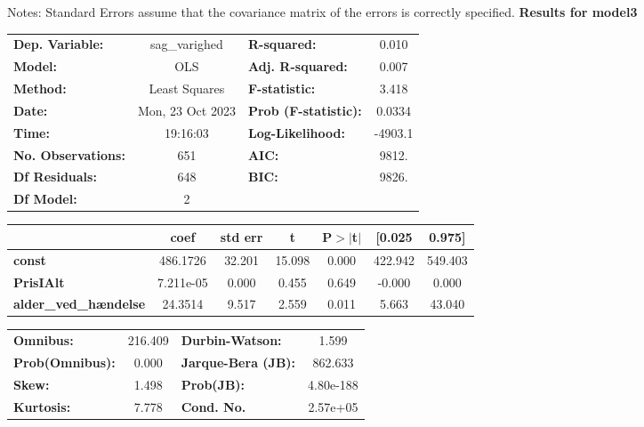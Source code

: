 Notes: \newline
 [1] Standard Errors assume that the covariance matrix of the errors is correctly specified.
\newpage 
\textbf{Results for model3} \\ 
\begin{center}
\begin{tabular}{lclc}
\toprule
\textbf{Dep. Variable:}       &  sag\_varighed   & \textbf{  R-squared:         } &     0.010   \\
\textbf{Model:}               &       OLS        & \textbf{  Adj. R-squared:    } &     0.007   \\
\textbf{Method:}              &  Least Squares   & \textbf{  F-statistic:       } &     3.418   \\
\textbf{Date:}                & Mon, 23 Oct 2023 & \textbf{  Prob (F-statistic):} &   0.0334    \\
\textbf{Time:}                &     19:16:03     & \textbf{  Log-Likelihood:    } &   -4903.1   \\
\textbf{No. Observations:}    &         651      & \textbf{  AIC:               } &     9812.   \\
\textbf{Df Residuals:}        &         648      & \textbf{  BIC:               } &     9826.   \\
\textbf{Df Model:}            &           2      & \textbf{                     } &             \\
\bottomrule
\end{tabular}
\begin{tabular}{lcccccc}
                              & \textbf{coef} & \textbf{std err} & \textbf{t} & \textbf{P$> |$t$|$} & \textbf{[0.025} & \textbf{0.975]}  \\
\midrule
\textbf{const}                &     486.1726  &       32.201     &    15.098  &         0.000        &      422.942    &      549.403     \\
\textbf{PrisIAlt}             &    7.211e-05  &        0.000     &     0.455  &         0.649        &       -0.000    &        0.000     \\
\textbf{alder\_ved\_hændelse} &      24.3514  &        9.517     &     2.559  &         0.011        &        5.663    &       43.040     \\
\bottomrule
\end{tabular}
\begin{tabular}{lclc}
\textbf{Omnibus:}       & 216.409 & \textbf{  Durbin-Watson:     } &     1.599  \\
\textbf{Prob(Omnibus):} &   0.000 & \textbf{  Jarque-Bera (JB):  } &   862.633  \\
\textbf{Skew:}          &   1.498 & \textbf{  Prob(JB):          } & 4.80e-188  \\
\textbf{Kurtosis:}      &   7.778 & \textbf{  Cond. No.          } &  2.57e+05  \\
\bottomrule
\end{tabular}
\end{center}


